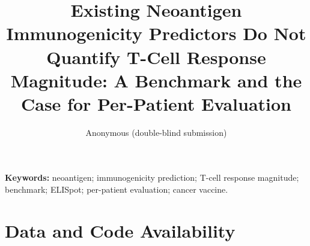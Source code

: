 \documentclass[11pt]{article}
\title{\textbf{Existing Neoantigen Immunogenicity Predictors Do Not Quantify
T-Cell Response Magnitude: A Benchmark and the Case for Per-Patient Evaluation}}
\author{Anonymous (double-blind submission)}
\date{}
\begin{document}
\maketitle

\begin{abstract}

\end{abstract}

\noindent\textbf{Keywords:} neoantigen; immunogenicity prediction; T-cell response magnitude;
benchmark; ELISpot; per-patient evaluation; cancer vaccine.








\section*{Data and Code Availability}




\end{document}
